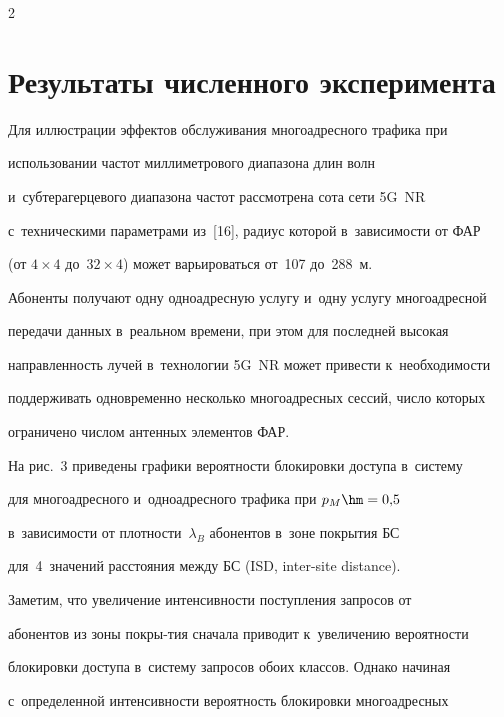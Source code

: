 \begin{multicols}{2}
\section{Результаты численного эксперимента}



\vspace*{-3pt}



  Для иллюстрации эффектов обслуживания многоадресного трафика при 

использовании час\-тот мил\-ли\-мет\-ро\-во\-го диапазона длин волн 

и~субтерагерцевого диапазона час\-тот рас\-смот\-ре\-на сота сети 5G~NR 

с~техническими па\-ра\-мет\-ра\-ми из~[16], радиус которой в~за\-ви\-си\-мости от ФАР 

(от $4\times4$ до~$32\times 4$) может варь\-и\-ро\-вать\-ся от~107 до~288~м. 

Абоненты получают одну одноадресную услугу и~одну услугу многоадресной 

передачи данных в~реальном времени, при этом для по\-след\-ней высокая 

на\-прав\-лен\-ность лучей в~технологии 5G~NR может привести к~не\-об\-хо\-ди\-мости 

поддерживать одновременно несколько многоадресных сессий, чис\-ло которых 

ограничено чис\-лом антенных элементов ФАР. 

  

  На рис.~3 приведены графики ве\-ро\-ят\-ности блокировки доступа в~сис\-те\-му 

для многоадресного и~одноадресного трафика при $p_M\hm= 0{,}5$ 

в~за\-ви\-си\-мости от плот\-ности~$\lambda_B$ абонентов в~зоне покрытия БС 

для~4~значений рас\-сто\-яния меж\-ду БС (ISD, inter-site distance). 

  



  Заметим, что увеличение ин\-тен\-сив\-ности по\-ступ\-ле\-ния запросов от 

абонентов из зоны покры-\linebreak тия сначала приводит к~увеличению ве\-ро\-ят\-ности\linebreak 

блокировки доступа в~сис\-те\-му запросов обоих классов. Однако начиная 

с~определенной ин\-тен\-сив\-ности ве\-ро\-ят\-ность блокировки многоадресных 


\end{multicols}
